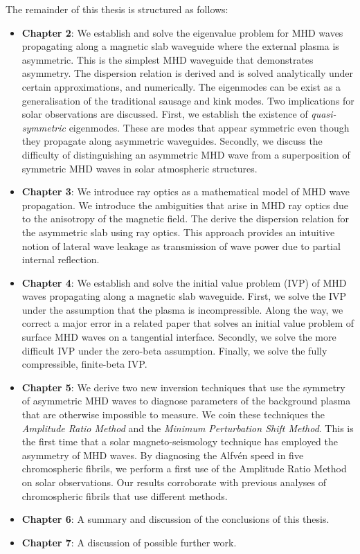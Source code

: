 The remainder of this thesis is structured as follows:
\begin{itemize}
	\item \textbf{Chapter 2}: We establish and solve the eigenvalue problem for MHD waves propagating along a magnetic slab waveguide where the external plasma is asymmetric. This is the simplest MHD waveguide that demonstrates asymmetry. The dispersion relation is derived and is solved analytically under certain approximations, and numerically. The eigenmodes can be exist as a generalisation of the traditional sausage and kink modes. Two implications for solar observations are discussed. First, we establish the existence of \textit{quasi-symmetric} eigenmodes. These are modes that appear symmetric even though they propagate along asymmetric waveguides. Secondly, we discuss the difficulty of distinguishing an asymmetric MHD wave from a superposition of symmetric MHD waves in solar atmospheric structures.
	\item \textbf{Chapter 3}: We introduce ray optics as a mathematical model of MHD wave propagation. We introduce the ambiguities that arise in MHD ray optics due to the anisotropy of the magnetic field. The derive the dispersion relation for the asymmetric slab using ray optics. This approach provides an intuitive notion of lateral wave leakage as transmission of wave power due to partial internal reflection.
	\item \textbf{Chapter 4}: We establish and solve the initial value problem (IVP) of MHD waves propagating along a magnetic slab waveguide. First, we solve the IVP under the assumption that the plasma is incompressible. Along the way, we correct a major error in a related paper that solves an initial value problem of surface MHD waves on a tangential interface. Secondly, we solve the more difficult IVP under the zero-beta assumption. Finally, we solve the fully compressible, finite-beta IVP.
	\item \textbf{Chapter 5}: We derive two new inversion techniques that use the symmetry of asymmetric MHD waves to diagnose parameters of the background plasma that are otherwise impossible to measure. We coin these techniques the \textit{Amplitude Ratio Method} and the \textit{Minimum Perturbation Shift Method}. This is the first time that a solar magneto-seismology technique has employed the asymmetry of MHD waves. By diagnosing the Alfv\'{e}n speed in five chromospheric fibrils, we perform a first use of the Amplitude Ratio Method on solar observations. Our results corroborate with previous analyses of chromospheric fibrils that use different methods.
	\item \textbf{Chapter 6}: A summary and discussion of the conclusions of this thesis.
	\item \textbf{Chapter 7}: A discussion of possible further work.
\end{itemize}
